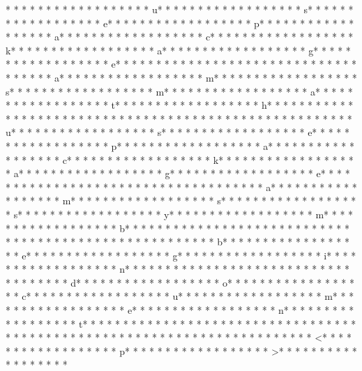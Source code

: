 * * *  * * *  * * *  *  * * *  *  * * *  * u* * *  * * *  * * *  *  * * *  *  * * *  * s* * *  * * *  * * *  *  * * *  *  * * *  * e* * *  * * *  * * *  *  * * *  *  * * *  * p* * *  * * *  * * *  *  * * *  *  * * *  * a* * *  * * *  * * *  *  * * *  *  * * *  * c* * *  * * *  * * *  *  * * *  *  * * *  * k* * *  * * *  * * *  *  * * *  *  * * *  * a* * *  * * *  * * *  *  * * *  *  * * *  * g* * *  * * *  * * *  *  * * *  *  * * *  * e* * *  * * *  * * *  *  * * *  *  * * *  * {* * *  * * *  * * *  *  * * *  *  * * *  * a* * *  * * *  * * *  *  * * *  *  * * *  * m* * *  * * *  * * *  *  * * *  *  * * *  * s* * *  * * *  * * *  *  * * *  *  * * *  * m* * *  * * *  * * *  *  * * *  *  * * *  * a* * *  * * *  * * *  *  * * *  *  * * *  * t* * *  * * *  * * *  *  * * *  *  * * *  * h* * *  * * *  * * *  *  * * *  *  * * *  * }* * *  * * *  * * *  *  * * *  *  * * *  * 
* * *  * * *  * * *  *  * * *  *  * * *  * u* * *  * * *  * * *  *  * * *  *  * * *  * s* * *  * * *  * * *  *  * * *  *  * * *  * e* * *  * * *  * * *  *  * * *  *  * * *  * p* * *  * * *  * * *  *  * * *  *  * * *  * a* * *  * * *  * * *  *  * * *  *  * * *  * c* * *  * * *  * * *  *  * * *  *  * * *  * k* * *  * * *  * * *  *  * * *  *  * * *  * a* * *  * * *  * * *  *  * * *  *  * * *  * g* * *  * * *  * * *  *  * * *  *  * * *  * e* * *  * * *  * * *  *  * * *  *  * * *  * {* * *  * * *  * * *  *  * * *  *  * * *  * a* * *  * * *  * * *  *  * * *  *  * * *  * m* * *  * * *  * * *  *  * * *  *  * * *  * s* * *  * * *  * * *  *  * * *  *  * * *  * s* * *  * * *  * * *  *  * * *  *  * * *  * y* * *  * * *  * * *  *  * * *  *  * * *  * m* * *  * * *  * * *  *  * * *  *  * * *  * b* * *  * * *  * * *  *  * * *  *  * * *  * }* * *  * * *  * * *  *  * * *  *  * * *  * 
* * *  * * *  * * *  *  * * *  *  * * *  * b* * *  * * *  * * *  *  * * *  *  * * *  * e* * *  * * *  * * *  *  * * *  *  * * *  * g* * *  * * *  * * *  *  * * *  *  * * *  * i* * *  * * *  * * *  *  * * *  *  * * *  * n* * *  * * *  * * *  *  * * *  *  * * *  * {* * *  * * *  * * *  *  * * *  *  * * *  * d* * *  * * *  * * *  *  * * *  *  * * *  * o* * *  * * *  * * *  *  * * *  *  * * *  * c* * *  * * *  * * *  *  * * *  *  * * *  * u* * *  * * *  * * *  *  * * *  *  * * *  * m* * *  * * *  * * *  *  * * *  *  * * *  * e* * *  * * *  * * *  *  * * *  *  * * *  * n* * *  * * *  * * *  *  * * *  *  * * *  * t* * *  * * *  * * *  *  * * *  *  * * *  * }* * *  * * *  * * *  *  * * *  *  * * *  * 
* * *  * * *  * * *  *  * * *  *  * * *  * 	* * *  * * *  * * *  *  * * *  *  * * *  * <* * *  * * *  * * *  *  * * *  *  * * *  * p* * *  * * *  * * *  *  * * *  *  * * *  * >* * *  * * *  * * *  *  * * *  *  * * *  * 
